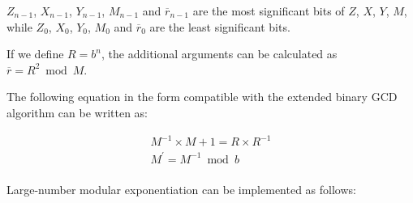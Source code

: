 \documentclass[main\_\_EN.tex]{subfiles}
\begin{document}
\begin{math}Z_{n-1}\end{math},
\begin{math}X_{n-1}\end{math},
\begin{math}Y_{n-1}\end{math},
\begin{math}M_{n-1}\end{math} and
\begin{math}\overline{r}_{n-1}\end{math} are the most significant bits of
\begin{math}Z\end{math},
\begin{math}X\end{math},
\begin{math}Y\end{math},
\begin{math}M\end{math}, while
\begin{math}Z_{0}\end{math},
\begin{math}X_{0}\end{math},
\begin{math}Y_{0}\end{math},
\begin{math}M_{0}\end{math} and
\begin{math}\overline{r}_{0}\end{math} are the least significant bits.

If we define \begin{math}R = b^{n}\end{math}, the additional arguments can be calculated as \begin{math}\overline{r} = R^{2} \bmod M\end{math}.

The following equation in the form compatible with the extended binary GCD algorithm can be written as: 

\begin{gather*}
        M^{-1} \times M + 1 = R \times R^{-1} \\
        M^{\prime} = M^{-1} \bmod b\\
\end{gather*}

Large-number modular exponentiation can be implemented as follows:
\end{document}
